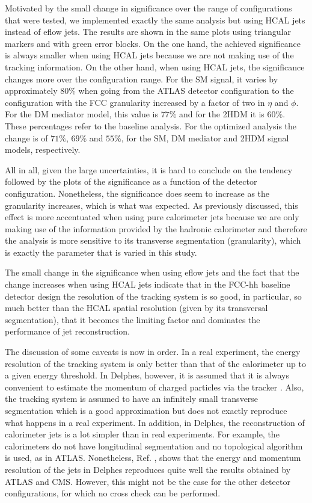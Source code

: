 Motivated by the small change in significance over the range of configurations that were tested, we implemented exactly the same analysis but using HCAL jets instead of eflow jets. The results are shown in the same plots using triangular markers and with green error blocks. On the one hand, the achieved significance is always smaller when using HCAL jets because we are not making use of the tracking information. On the other hand, when using HCAL jets, the significance changes more over the configuration range. For the SM signal, it varies by approximately $80\%$ when going from the ATLAS detector configuration to the configuration with the FCC granularity increased by a factor of two in $\eta$ and $\phi$. For the DM mediator model, this value is $77\%$ and for the 2HDM it is $60\%$. These percentages refer to the baseline analysis. For the optimized analysis the change is of $71\%$, $69\%$ and $55\%$, for the SM, DM mediator and 2HDM signal models, respectively.

All in all, given the large uncertainties, it is hard to conclude on the tendency followed by the plots of the significance as a function of the detector configuration. Nonetheless, the significance does seem to increase as the granularity increases, which is what was expected. As previously discussed, this effect is more accentuated when using pure calorimeter jets because we are only making use of the information provided by the hadronic calorimeter and therefore the analysis is more sensitive to its transverse segmentation (granularity), which is exactly the parameter that is varied in this study.

The small change in the significance when using eflow jets and the fact that the change increases when using HCAL jets indicate that in the FCC-hh baseline detector design the resolution of the tracking system is so good, in particular, so much better than the HCAL spatial resolution (given by its transversal segmentation), that it becomes the limiting factor and dominates the performance of jet reconstruction.

The discussion of some caveats is now in order. In a real experiment, the energy resolution of the tracking system is only better than that of the calorimeter up to a given energy threshold. In Delphes, however, it is assumed that it is always convenient to estimate the momentum of charged particles via the tracker \cite{Delphes}. Also, the tracking system is assumed to have an infinitely small transverse segmentation which is a good approximation but does not exactly reproduce what happens in a  real experiment. In addition, in Delphes, the reconstruction of calorimeter jets is a lot simpler than in real experiments. For example, the calorimeters do not have longitudinal segmentation and no topological algorithm is used, as in ATLAS. Nonetheless, Ref. \cite{Delphes}, shows that the energy and momentum resolution of the jets in Delphes reproduces quite well the results obtained by ATLAS and CMS. However, this might not be the case for the other detector configurations, for which no cross check can be performed. 

